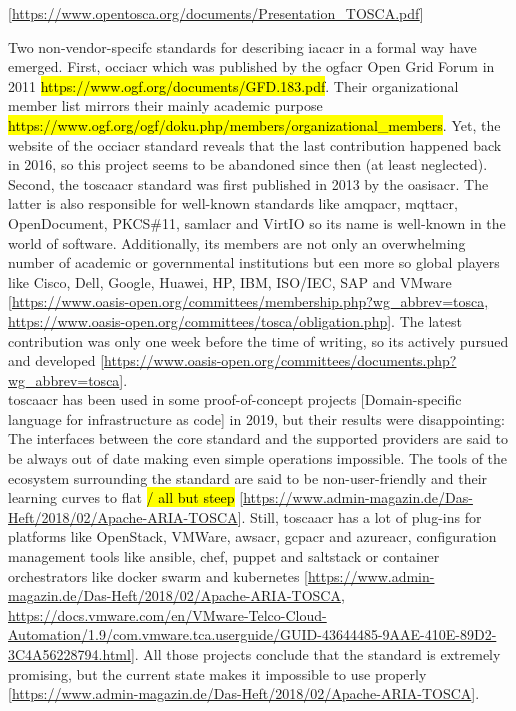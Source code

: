 [\url{https://www.opentosca.org/documents/Presentation_TOSCA.pdf}]

Two non-vendor-specifc standards for describing \gls{iacacr} in a formal way have emerged. First, \gls{occiacr} which was published by the \gls{ogfacr} Open Grid Forum in 2011 \hl{https://www.ogf.org/documents/GFD.183.pdf}. Their organizational member list mirrors their mainly academic purpose \hl{https://www.ogf.org/ogf/doku.php/members/organizational\_members}. Yet, the website of the \gls{occiacr} standard reveals that the last contribution happened back in 2016, so this project seems to be abandoned since then (at least neglected).
\\
Second, the \gls{toscaacr} standard was first published in 2013 by the \gls{oasisacr}. The latter is also responsible for well-known standards like \gls{amqpacr}, \gls{mqttacr}, OpenDocument, PKCS\#11, \gls{samlacr} and VirtIO so its name is well-known in the world of software. Additionally, its members are not only an overwhelming number of academic or governmental institutions but een more so global players like Cisco, Dell, Google, Huawei, HP, IBM, ISO/IEC, SAP and VMware [\url{https://www.oasis-open.org/committees/membership.php?wg_abbrev=tosca, https://www.oasis-open.org/committees/tosca/obligation.php}]. The latest contribution was only one week before the time of writing, so its actively pursued and developed [\url{https://www.oasis-open.org/committees/documents.php?wg_abbrev=tosca}].
\\
\gls{toscaacr} has been used in some proof-of-concept projects [Domain-specific language for infrastructure as code] in 2019, but their results were disappointing: The interfaces between the core standard and the supported providers are said to be always out of date making even simple operations impossible. The tools of the ecosystem surrounding the standard are said to be non-user-friendly and their learning curves to flat \hl{/ all but steep} [\url{https://www.admin-magazin.de/Das-Heft/2018/02/Apache-ARIA-TOSCA}].
Still, \gls{toscaacr} has a lot of plug-ins for platforms like OpenStack, VMWare, \gls{awsacr}, \gls{gcpacr} and \gls{azureacr}, configuration management tools like ansible, chef, puppet and saltstack or container orchestrators like docker swarm and kubernetes [\url{https://www.admin-magazin.de/Das-Heft/2018/02/Apache-ARIA-TOSCA}, \url{https://docs.vmware.com/en/VMware-Telco-Cloud-Automation/1.9/com.vmware.tca.userguide/GUID-43644485-9AAE-410E-89D2-3C4A56228794.html}].
All those projects conclude that the standard is extremely promising, but the current state makes it impossible to use properly [\url{https://www.admin-magazin.de/Das-Heft/2018/02/Apache-ARIA-TOSCA}].
